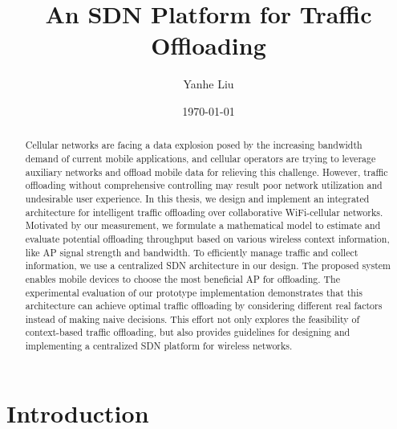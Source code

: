 \documentclass[english]{tktltiki}
\begin{document}
\onehalfspacing

\title{An SDN Platform for Traffic Offloading}
\author{Yanhe Liu}
\date{\today}

\maketitle



\begin{abstract}

Cellular networks are facing a data explosion posed by the increasing bandwidth demand of current mobile applications, and cellular operators are trying to leverage auxiliary networks and offload mobile data for relieving this challenge. However, traffic offloading without comprehensive controlling may result poor network utilization and undesirable user experience. In this thesis, we design and implement an integrated architecture for intelligent traffic offloading over collaborative WiFi-cellular networks. Motivated by our measurement, we formulate a mathematical model to estimate and evaluate potential offloading throughput based on various wireless context information, like AP signal strength and bandwidth. To efficiently manage traffic and collect information, we use a centralized SDN architecture in our design. The proposed system enables mobile devices to choose the most beneficial AP for offloading. The experimental evaluation of our prototype implementation demonstrates that this architecture can achieve optimal traffic offloading by considering different real factors instead of making naive decisions. This effort not only explores the feasibility of context-based traffic offloading, but also provides guidelines for designing and implementing a centralized SDN platform for wireless networks.


\end{abstract}

\mytableofcontents


\section{Introduction}
\end{document}
